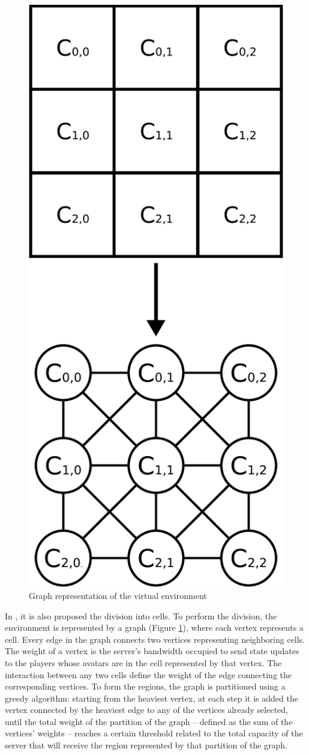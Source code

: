 \documentclass[acmtocl]{acmtrans2m}
\begin{document}
\begin{figure}[!t]
	\centering
	\includegraphics[width=0.5\linewidth]{images/grafo}
	\caption{Graph representation of the virtual environment}
	\label{fig:graph}
\end{figure}

In \cite{bezerra2009lbs}, it is also proposed the division into cells. To perform the division, the environment is represented by a graph (Figure \ref{fig:graph}), where each vertex represents a cell. Every edge in the graph connects two vertices representing neighboring cells. The weight of a vertex is the server's bandwidth occupied to send state updates to the players whose avatars are in the cell represented by that vertex. The interaction between any two cells define the weight of the edge connecting the corresponding vertices. To form the regions, the graph is partitioned using a greedy algorithm: starting from the heaviest vertex, at each step it is added the vertex connected by the heaviest edge to any of the vertices already selected, until the total weight of the partition of the graph -- defined as the sum of the vertices' weights -- reaches a certain threshold related to the total capacity of the server that will receive the region represented by that partition of the graph.
\end{document}
